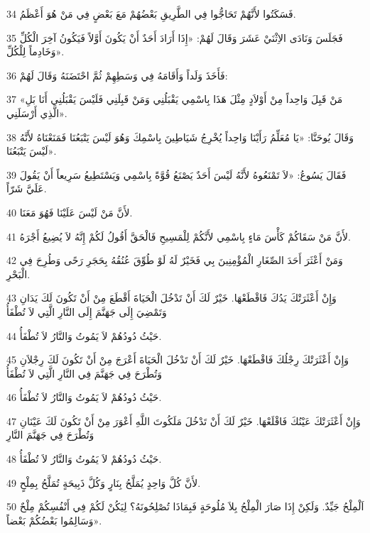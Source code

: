 \par 34 فَسَكَتُوا لأَنَّهُمْ تَحَاجُّوا فِي الطَّرِيقِ بَعْضُهُمْ مَعَ بَعْضٍ فِي مَنْ هُوَ أَعْظَمُ.
\par 35 فَجَلَسَ وَنَادَى الاِثْنَيْ عَشَرَ وَقَالَ لَهُمْ: «إِذَا أَرَادَ أَحَدٌ أَنْ يَكُونَ أَوَّلاً فَيَكُونُ آخِرَ الْكُلِّ وَخَادِماً لِلْكُلِّ».
\par 36 فَأَخَذَ وَلَداً وَأَقَامَهُ فِي وَسَطِهِمْ ثُمَّ احْتَضَنَهُ وَقَالَ لَهُمْ:
\par 37 «مَنْ قَبِلَ وَاحِداً مِنْ أَوْلاَدٍ مِثْلَ هَذَا بِاسْمِي يَقْبَلُنِي وَمَنْ قَبِلَنِي فَلَيْسَ يَقْبَلُنِي أَنَا بَلِ الَّذِي أَرْسَلَنِي».
\par 38 وَقَالَ يُوحَنَّا: «يَا مُعَلِّمُ رَأَيْنَا وَاحِداً يُخْرِجُ شَيَاطِينَ بِاسْمِكَ وَهُوَ لَيْسَ يَتْبَعُنَا فَمَنَعْنَاهُ لأَنَّهُ لَيْسَ يَتْبَعُنَا».
\par 39 فَقَالَ يَسُوعُ: «لاَ تَمْنَعُوهُ لأَنَّهُ لَيْسَ أَحَدٌ يَصْنَعُ قُوَّةً بِاسْمِي وَيَسْتَطِيعُ سَرِيعاً أَنْ يَقُولَ عَلَيَّ شَرّاً.
\par 40 لأَنَّ مَنْ لَيْسَ عَلَيْنَا فَهُوَ مَعَنَا.
\par 41 لأَنَّ مَنْ سَقَاكُمْ كَأْسَ مَاءٍ بِاسْمِي لأَنَّكُمْ لِلْمَسِيحِ فَالْحَقَّ أَقُولُ لَكُمْ إِنَّهُ لاَ يُضِيعُ أَجْرَهُ.
\par 42 وَمَنْ أَعْثَرَ أَحَدَ الصِّغَارِ الْمُؤْمِنِينَ بِي فَخَيْرٌ لَهُ لَوْ طُوِّقَ عُنُقُهُ بِحَجَرِ رَحًى وَطُرِحَ فِي الْبَحْرِ.
\par 43 وَإِنْ أَعْثَرَتْكَ يَدُكَ فَاقْطَعْهَا. خَيْرٌ لَكَ أَنْ تَدْخُلَ الْحَيَاةَ أَقْطَعَ مِنْ أَنْ تَكُونَ لَكَ يَدَانِ وَتَمْضِيَ إِلَى جَهَنَّمَ إِلَى النَّارِ الَّتِي لاَ تُطْفَأُ
\par 44 حَيْثُ دُودُهُمْ لاَ يَمُوتُ وَالنَّارُ لاَ تُطْفَأُ.
\par 45 وَإِنْ أَعْثَرَتْكَ رِجْلُكَ فَاقْطَعْهَا. خَيْرٌ لَكَ أَنْ تَدْخُلَ الْحَيَاةَ أَعْرَجَ مِنْ أَنْ تَكُونَ لَكَ رِجْلاَنِ وَتُطْرَحَ فِي جَهَنَّمَ فِي النَّارِ الَّتِي لاَ تُطْفَأُ
\par 46 حَيْثُ دُودُهُمْ لاَ يَمُوتُ وَالنَّارُ لاَ تُطْفَأُ.
\par 47 وَإِنْ أَعْثَرَتْكَ عَيْنُكَ فَاقْلَعْهَا. خَيْرٌ لَكَ أَنْ تَدْخُلَ مَلَكُوتَ اللَّهِ أَعْوَرَ مِنْ أَنْ تَكُونَ لَكَ عَيْنَانِ وَتُطْرَحَ فِي جَهَنَّمَ النَّارِ
\par 48 حَيْثُ دُودُهُمْ لاَ يَمُوتُ وَالنَّارُ لاَ تُطْفَأُ.
\par 49 لأَنَّ كُلَّ وَاحِدٍ يُمَلَّحُ بِنَارٍ وَكُلَّ ذَبِيحَةٍ تُمَلَّحُ بِمِلْحٍ.
\par 50 اَلْمِلْحُ جَيِّدٌ. وَلَكِنْ إِذَا صَارَ الْمِلْحُ بِلاَ مُلُوحَةٍ فَبِمَاذَا تُصْلِحُونَهُ؟ لِيَكُنْ لَكُمْ فِي أَنْفُسِكُمْ مِلْحٌ وَسَالِمُوا بَعْضُكُمْ بَعْضاً».

